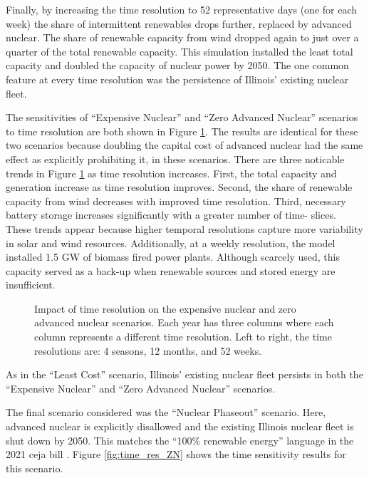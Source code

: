 Finally, by increasing the time resolution to 52 representative days (one for
each week) the share of intermittent renewables drops further, replaced by
advanced nuclear. The share of renewable capacity from wind dropped again to
just over a quarter of the total renewable capacity. This simulation installed
the least total capacity and doubled the capacity of nuclear power by 2050.
The one common feature at every time resolution was the persistence of Illinois'
existing nuclear fleet.

The sensitivities of ``Expensive Nuclear'' and ``Zero Advanced Nuclear'' scenarios
to time resolution are both shown in Figure \ref{fig:time_res_ZAN}. The results
are identical for these two scenarios because doubling the capital cost of
advanced nuclear had the same effect as explicitly prohibiting it, in these scenarios.
There are three noticable trends in Figure \ref{fig:time_res_ZAN} as time resolution
increases. First, the total capacity and generation increase as time resolution improves.
Second, the share of renewable capacity from wind decreases with improved time resolution.
Third, necessary battery storage increases significantly with a greater number of time-
slices. These trends appear because higher temporal resolutions capture more
variability in solar and wind resources. Additionally, at a weekly resolution, the
model installed 1.5 GW of biomass fired power plants. Although scarcely used,
this capacity served as a back-up when renewable sources and stored energy are
insufficient.

\begin{figure}[H]
  \centering
  \resizebox{0.95\columnwidth}{!}{}
  \caption{Impact of time resolution on the expensive nuclear and zero advanced nuclear
  scenarios. Each year has three columns where each column represents a different time
  resolution. Left to right, the time resolutions are: 4 seasons, 12 months, and 52 weeks.}
  \label{fig:time_res_ZAN}
\end{figure}

As in the ``Least Cost'' scenario, Illinois' existing nuclear fleet persists in
both the ``Expensive Nuclear'' and ``Zero Advanced Nuclear'' scenarios.

The final scenario considered was the ``Nuclear Phaseout'' scenario. Here, advanced
nuclear is explicitly disallowed and the existing Illinois nuclear fleet is shut down by
2050. This matches the ``100\% renewable energy'' language in the 2021 \gls{ceja} bill
\cite{harmon_climate_2021}. Figure \ref{fig:time_res_ZN} shows the time sensitivity
results for this scenario.

